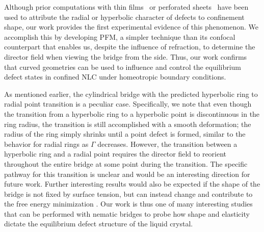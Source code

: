 Although prior computations with thin films~\cite{RN141} or perforated sheets~\cite{RN149} have been used to attribute the radial or hyperbolic character of defects to confinement shape, our work provides the first experimental evidence of this phenomenon.
We accomplish this by developing PFM, a simpler technique than its confocal counterpart that enables us, despite the influence of refraction, to determine the director field when viewing the bridge from the side.
Thus, our work confirms that curved geometries can be used to influence and control the equilibrium defect states in confined NLC under homeotropic boundary conditions.

As mentioned earlier, the cylindrical bridge with the predicted hyperbolic ring to radial point transition is a peculiar case.
Specifically, we note that even though the transition from a hyperbolic ring to a hyperbolic point is discontinuous in the ring radius, the transition is still accomplished with a smooth deformation; the radius of the ring simply shrinks until a point defect is formed, similar to the behavior for radial rings as $\Gamma$ decreases.
However, the transition between a hyperbolic ring and a radial point requires the director field to reorient throughout the entire bridge at some point during the transition.
The specific pathway for this transition is unclear and would be an interesting direction for future work.
Further interesting results would also be expected if the shape of the bridge is not fixed by surface tension, but can instead change and contribute to the free energy minimization \cite{RN12}.
Our work is thus one of many interesting studies that can be performed with nematic bridges to probe how shape and elasticity dictate the equilibrium defect structure of the liquid crystal.
